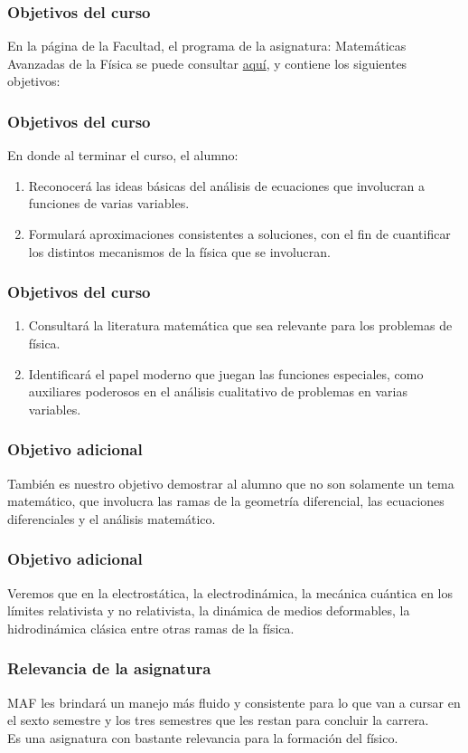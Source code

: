 \documentclass[12pt]{beamer}
\begin{document}
\begin{frame}
\frametitle{Objetivos del curso}
En la página de la Facultad, el programa de la asignatura: Matemáticas Avanzadas de la Física se puede consultar 
\href{https://www.fciencias.unam.mx/sites/default/files/temario/610.pdf}{aquí}, y contiene los siguientes objetivos:
\end{frame}
\begin{frame}
\frametitle{Objetivos del curso}
En donde al terminar el curso, el alumno:
\begin{enumerate}[<+->]
\item Reconocerá las ideas básicas del análisis de ecuaciones que involucran a funciones de varias variables.
\item Formulará aproximaciones consistentes a soluciones, con el fin de cuantificar los distintos mecanismos de la física que se involucran.
\seti
\end{enumerate}
\end{frame}
\begin{frame}
\frametitle{Objetivos del curso}
\begin{enumerate}[<+->]
\conti
\item Consultará la literatura matemática que sea relevante para los problemas de física.
\item Identificará el papel moderno que juegan las funciones especiales, como auxiliares poderosos en el análisis cualitativo de problemas en varias variables.
\end{enumerate}
\end{frame}
\begin{frame}
\frametitle{Objetivo adicional}
También es nuestro objetivo demostrar al alumno que  no son solamente un tema matemático, que involucra las ramas de la geometría diferencial, las ecuaciones diferenciales y el análisis matemático.
\end{frame}
\begin{frame}
\frametitle{Objetivo adicional}
Veremos que  en la electrostática, la electrodinámica, la mecánica cuántica en los límites relativista y no relativista, la dinámica de medios deformables, la hidrodinámica clásica entre otras ramas de la física.
\end{frame}
\begin{frame}
\frametitle{Relevancia de la asignatura}
MAF les brindará un manejo más fluido y consistente para lo que van a cursar en el sexto semestre y los tres semestres que les restan para concluir la carrera.
\\
\bigskip
\pause
Es una asignatura con bastante relevancia para la formación del físico.
\end{frame}
\end{document}
